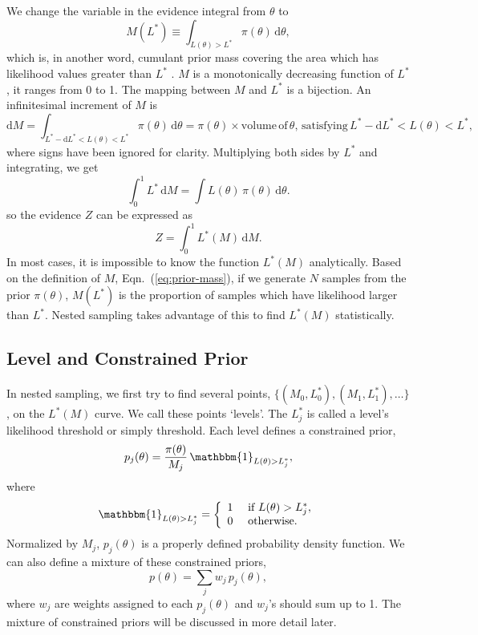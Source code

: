 \documentclass[letterpaper, preprint]{aastex}
\begin{document}
We change the variable in the evidence integral from $\theta$ to
\begin{equation}
M(L^*) \equiv \int_{L(\theta)>L^*}\!\pi(\theta)\,\mathrm{d}\theta,
 \label{eq:prior-mass}
\end{equation}
which is, in another word, cumulant prior mass covering the area which has likelihood values greater than $L^*$ \citep{skilling06a}. $M$ is a monotonically decreasing function of $L^*$, it ranges from 0 to 1. The mapping between $M$ and $L^*$ is a bijection. An infinitesimal increment of $M$ is
\begin{equation}
\mathrm{d}M=\int_{L^*-\mathrm{d}L^*<L(\theta)<L^*}\!\pi(\theta)\,\mathrm{d}\theta = \pi(\theta)\times \mathrm{volume\,of}\,\theta,\,\mathrm{satisfying}\, L^*-\mathrm{d}L^*<L(\theta)<L^*,
\label{eq:dM}
\end{equation}
where signs have been ignored for clarity. Multiplying both sides by $L^*$ and integrating, we get
\begin{equation}
\int^1_0\! L^*\,\mathrm{d}M=\int\!L(\theta)\,\pi(\theta)\,\mathrm{d}\theta.
\label{eq:int-dM}
\end{equation}
so the evidence $Z$ can be expressed as
\begin{equation}
Z=\int^1_0\! L^*(M)\,\mathrm{d}M.
 \label{eq:evidence-prior-mass}
\end{equation}
In most cases, it is impossible to know the function $L^*(M)$ analytically. Based on the definition of $M$, Eqn.~(\ref{eq:prior-mass}), if we generate $N$ samples from the prior $\pi(\theta)$, $M(L^*)$ is the proportion of samples which have likelihood larger than $L^*$. Nested sampling takes advantage of this to find $L^*(M)$ statistically.

\subsection{Level and Constrained Prior}
In nested sampling, we first try to find several points, $\{(M_0, L_0^*),(M_1,L_1^*),\ldots\}$, on the $L^*(M)$ curve. We call these points `levels'. The $L^*_j$ is called a level's likelihood threshold or simply threshold. Each level defines a constrained prior,
\begin{equation} 
p_{j}(\theta) = \frac{\pi(\theta)}{M_j}\,\mathbbm{1}_{L(\theta)>L_j^*},
\label{eq:constrained-prior}
\end{equation}
where
\begin{eqnarray*}
\mathbbm{1}_{L(\theta)>L_j^*} = \left\{ \begin{array}{ll}
               1 & \mbox{ if } L(\theta)>L_j^*,\\
               0 & \mbox{ otherwise.} \end{array}  \right.
\end{eqnarray*}
Normalized by $M_j$, $p_{j}(\theta)$ is a properly defined probability density function. We can also define a mixture of these constrained priors,
\begin{equation*}
p(\theta) = \sum_{j} w_j\,p_{j}(\theta),
\end{equation*}
where $w_j$ are weights assigned to each $p_j(\theta)$ and $w_j$'s should sum up to 1. The mixture of constrained priors will be discussed in more detail later.
\end{document}
